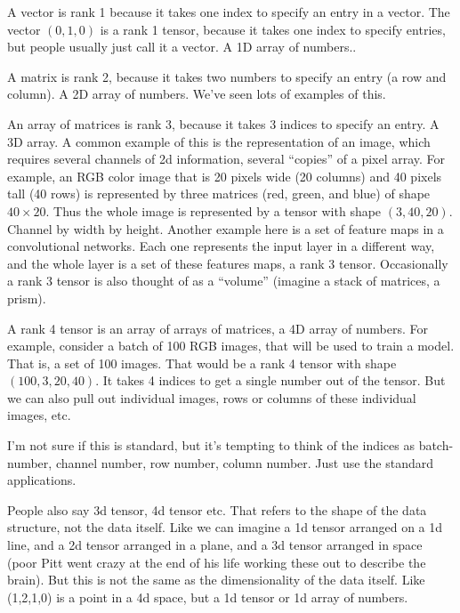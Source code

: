 A vector is rank 1 because it takes one index to specify an entry in a vector.  The vector $(0,1,0)$ is a rank 1 tensor, because it takes one index to specify entries, but people usually just call it a vector. A 1D array of numbers..

A matrix is rank 2, because it takes two numbers to specify an entry (a row and column). A 2D array of numbers. We've seen lots of examples of this.

An array of matrices is rank 3, because it takes 3 indices to specify an entry. A 3D array. A common example of this is the representation of an image, which requires several channels of 2d information, several ``copies'' of a pixel array.  For example, an RGB color image that is 20 pixels wide (20 columns) and 40 pixels tall (40 rows) is represented by three matrices (red, green, and blue) of shape $40 \times 20$.  Thus the whole image is represented by a tensor with shape $(3,40,20)$. Channel by width by height.  Another example here is a set of feature maps in a convolutional networks. Each one represents the input layer in a different way, and the whole layer is a set of these features maps, a rank 3 tensor. Occasionally a rank 3 tensor is also thought of as a ``volume'' (imagine a stack of matrices, a prism).
 
 A rank 4 tensor is an array of arrays of matrices, a 4D array of numbers.  For example, consider a batch of 100 RGB images, that will be used to train a model. That is, a set of 100 images. That would be a rank 4 tensor with shape $(100,3,20,40)$. It takes 4 indices to get a single number out of the tensor.   But we can also pull out individual images, rows or columns of these individual images, etc.
 
 
 I'm not sure if this is standard, but it's tempting to think of the indices as batch-number, channel number, row number, column number. Just use the standard applications.

People also say 3d tensor, 4d tensor etc.  That refers to the shape of the data structure, not the data itself.  Like we can imagine a 1d tensor arranged on a 1d line, and a 2d tensor arranged in a plane, and a 3d tensor arranged in space (poor Pitt went crazy at the end of his life working these out to describe the brain).  But this is not the same as the dimensionality of the data itself. Like (1,2,1,0) is a point in a 4d space, but a 1d tensor or 1d array of numbers.


